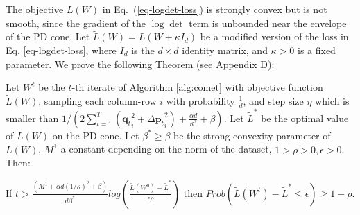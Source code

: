 \documentclass[twoside,11pt]{article}
\newcommand\mat[1]{{#1}}
\renewcommand\vec[1]{\mathbf{#1}}
\newcommand{\W}{\mat{W}}
\newcommand{\tL}{\tilde{L}(\W)}
\newcommand{\q}{{\vec{q}}}
\newcommand{\trip}{{t}}
\newcommand{\qt}{{\q_{\trip}}}
\renewcommand{\eqref}[1]{Eq.~(\ref{#1})}
\begin{document}
The objective $L(\W)$ in \eqref{eq-logdet-loss} is strongly convex but is not smooth, since the gradient of the $\log \det$ term is unbounded near the envelope of the PD cone. Let $\tilde{L}({\W}) = L({\W + \kappa I_d})$ be a modified version of the loss in Eq. \ref{eq-logdet-loss}, where $I_d$ is the $d \times d$ identity matrix, and $\kappa>0$ is a fixed parameter.
We prove the following Theorem (see Appendix D):

\begin{theorem}
Let $\W^t$ be the $t$-th iterate of Algorithm \ref{alg:comet} with objective function $\tL$, sampling each column-row $i$ with probability $\frac{1}{d}$, and step size $\eta$ which is smaller than $1/\left( 2 \sum_{t=1}^T (\qt_i^2 +{\Delta\vec{p}_{t}}_i^2) + \frac{\alpha d}{\kappa^2} + \beta\right)$. Let $\tilde{L}^*$ be the optimal value of $\tL$ on the PD cone. Let $\beta^* \geq \beta$ be the strong convexity parameter of $\tL$, $M^1$ a constant depending on the norm of the dataset, $1 > \rho >0, \epsilon>0$. Then:

If $t > \frac{ (M^1 + \alpha d (1/\kappa)^2 + \beta)}{d\beta^*} log \left( \frac{\tilde{L}(W^0) - \tilde{L}^*}{\epsilon \rho}\right)$ then $Prob(\tilde{L}(\W^t) - \tilde{L}^* \leq \epsilon) \geq 1-\rho$.
\end{theorem}




\end{document}
